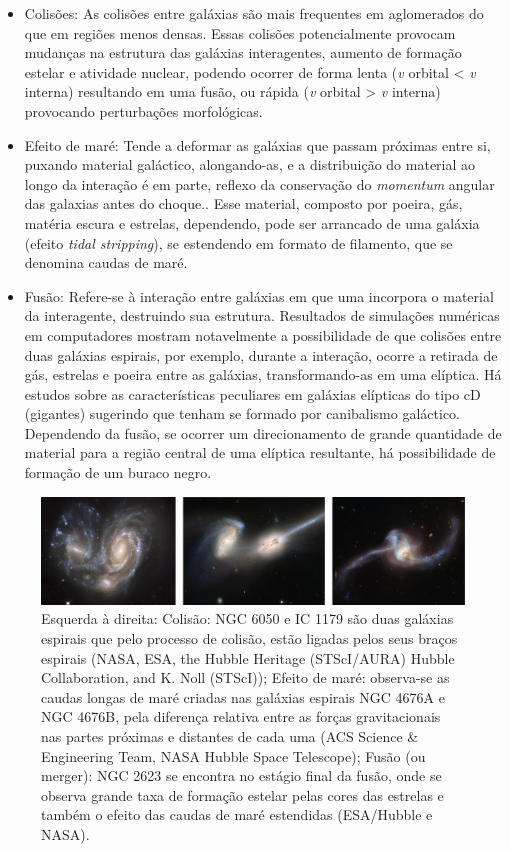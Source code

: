 \begin{itemize}
	\item Colisões: As colisões entre galáxias são mais frequentes em aglomerados do que em regiões menos densas. Essas colisões potencialmente provocam mudanças na estrutura das galáxias interagentes, aumento de formação estelar e atividade nuclear, podendo ocorrer de forma lenta (\emph{v} orbital < \emph{v} interna) resultando em uma fusão, ou rápida  (\emph{v} orbital > \emph{v} interna) provocando perturbações morfológicas.
	\item Efeito de maré: Tende a deformar as galáxias que passam próximas entre si, puxando material galáctico, alongando-as, e a distribuição do material ao longo da interação é em parte, reflexo da conservação do \emph{momentum} angular das galaxias antes do choque.. Esse material, composto por poeira, gás, matéria escura e estrelas, dependendo, pode ser arrancado de uma galáxia (efeito \emph{tidal stripping}), se estendendo em formato de filamento, que se denomina caudas de maré. 
	\item Fusão: Refere-se à interação entre galáxias em que uma incorpora o material da interagente, destruindo sua estrutura. Resultados de simulações numéricas em computadores \cite{Barnes1996} mostram notavelmente a possibilidade de que colisões entre duas galáxias espirais, por exemplo, durante a interação, ocorre a retirada de gás, estrelas e poeira entre as galáxias, transformando-as em uma elíptica. Há estudos sobre as características peculiares em galáxias elípticas do tipo cD (gigantes) sugerindo que tenham se formado por canibalismo galáctico. Dependendo da fusão, se ocorrer um direcionamento de grande quantidade de material para a região central de uma elíptica resultante, há possibilidade de formação de um buraco negro.
\end{itemize}

\begin{figure}[h] 
  \centering 
  \includegraphics[width=1.0\textwidth]{Imagens/int_08.png} 
  \caption[Interação entre galáxias.]{Esquerda à direita: Colisão: NGC 6050 e IC 1179 são duas galáxias espirais que pelo processo de colisão, estão ligadas pelos seus braços espirais (NASA, ESA, the Hubble Heritage (STScI/AURA) Hubble Collaboration, and K. Noll (STScI)); Efeito de maré: observa-se as caudas longas de maré criadas nas galáxias espirais NGC 4676A e NGC 4676B, pela diferença relativa entre as forças gravitacionais nas partes próximas e distantes de cada uma (ACS Science \& Engineering Team, NASA Hubble Space Telescope); Fusão (ou merger): NGC 2623 se encontra no estágio final da fusão, onde se observa grande taxa de formação estelar pelas cores das estrelas e também o efeito das caudas de maré estendidas (ESA/Hubble e NASA).}
  \label{fig:interações} 
\end{figure}

